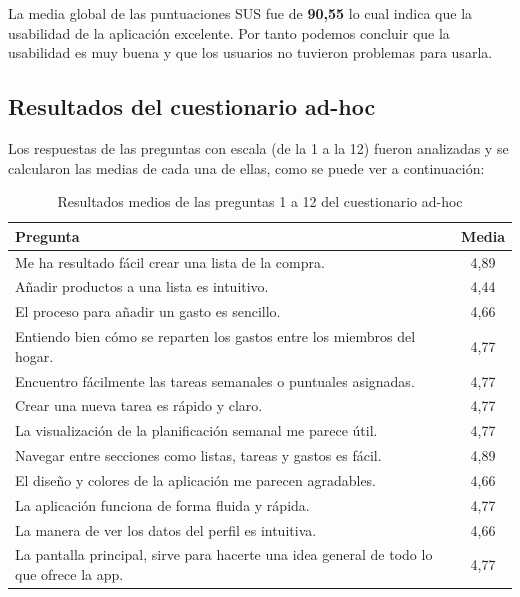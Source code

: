 La media global de las puntuaciones SUS fue de \textbf{90,55} lo cual indica que la usabilidad de la aplicación excelente.
Por tanto podemos concluir que la usabilidad es muy buena y que los usuarios no tuvieron problemas para usarla.


\subsection{Resultados del cuestionario ad-hoc}

Los respuestas de las preguntas con escala (de la 1 a la 12) fueron analizadas y se calcularon las medias de cada una de ellas, como se puede ver a continuación: 

\begin{table}[H]
    \centering
    \renewcommand{\arraystretch}{1.2}
    \begin{tabular}{|p{10cm}|c|}
        \hline
        \textbf{Pregunta} & \textbf{Media} \\
        \hline
        Me ha resultado fácil crear una lista de la compra. & 4,89 \\ \hline
        Añadir productos a una lista es intuitivo. & 4,44 \\ \hline
        El proceso para añadir un gasto es sencillo. &  4,66 \\ \hline
        Entiendo bien cómo se reparten los gastos entre los miembros del hogar. & 4,77 \\ \hline
        Encuentro fácilmente las tareas semanales o puntuales asignadas. &  4,77\\ \hline
        Crear una nueva tarea es rápido y claro. &  4,77 \\ \hline
        La visualización de la planificación semanal me parece útil. & 4,77 \\ \hline
        Navegar entre secciones como listas, tareas y gastos es fácil. &  4,89 \\ \hline
        El diseño y colores de la aplicación me parecen agradables. &  4,66 \\ \hline
        La aplicación funciona de forma fluida y rápida. &  4,77 \\ \hline
        La manera de ver los datos del perfil es intuitiva. &  4,66 \\ \hline
        La pantalla principal, sirve para hacerte una idea general de todo lo que ofrece la app. & 4,77 \\ \hline
    \end{tabular}
    \caption{Resultados medios de las preguntas 1 a 12 del cuestionario ad-hoc}
    \label{tab:adhoc-medias}
\end{table}

